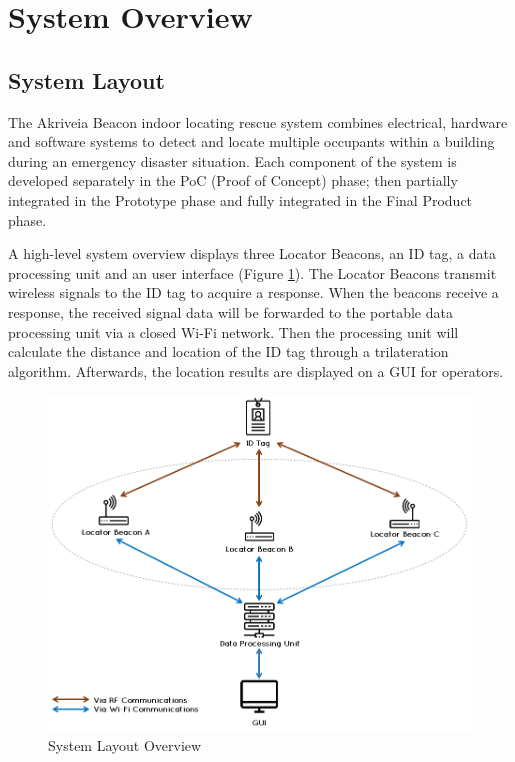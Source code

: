 

\setcounter{section}{1}
\section{System Overview}
\bigskip
\subsection{System Layout}
The Akriveia Beacon indoor locating rescue system combines electrical, hardware and software systems to detect and locate multiple occupants within a building during an emergency disaster situation. Each component of the system is developed separately in the PoC (Proof of Concept) phase; then partially integrated in the Prototype phase and fully integrated in the Final Product phase.

\bigskip
A high-level system overview displays three Locator Beacons, an ID tag, a data processing unit and an user interface (Figure \ref{fig:system_layout}). The Locator Beacons transmit wireless signals to the ID tag to acquire a response. When the beacons receive a response, the received signal data will be forwarded to the portable data processing unit via a closed Wi-Fi network. Then the processing unit will calculate the distance and location of the ID tag through a trilateration algorithm. Afterwards, the location results are displayed on a \Gls{GUI} for operators.

\begin{figure}[h!]
    \centering
    \includegraphics[width=\linewidth]{./images/00_sys_arch.png}
    \caption{System Layout Overview}
    \label{fig:system_layout}
\end{figure}


